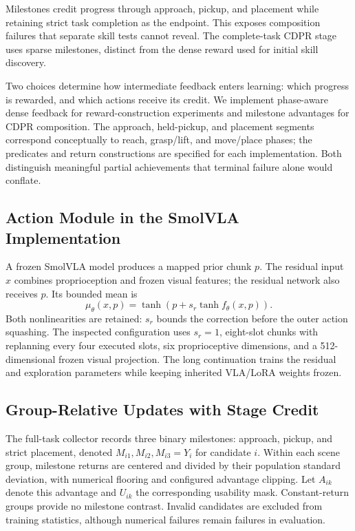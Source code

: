 Milestones credit progress through approach, pickup, and placement while retaining strict task completion as the endpoint. This exposes composition failures that separate skill tests cannot reveal. The complete-task CDPR stage uses sparse milestones, distinct from the dense reward used for initial skill discovery.

Two choices determine how intermediate feedback enters learning: which progress is rewarded, and which actions receive its credit. We implement phase-aware dense feedback for reward-construction experiments and milestone advantages for CDPR composition. The approach, held-pickup, and placement segments correspond conceptually to reach, grasp/lift, and move/place phases; the predicates and return constructions are specified for each implementation. Both distinguish meaningful partial achievements that terminal failure alone would conflate.



\subsection{Action Module in the SmolVLA Implementation}
A frozen SmolVLA model produces a mapped prior chunk $p$. The residual input $x$ combines proprioception and frozen visual features; the residual network also receives $p$. Its bounded mean is
\begin{equation}
\mu_\theta(x,p)=\tanh\!\left(p+s_r\tanh f_\theta(x,p)\right).
\label{eq:actor}
\end{equation}
Both nonlinearities are retained: $s_r$ bounds the correction before the outer action squashing. The inspected configuration uses $s_r=1$, eight-slot chunks with replanning every four executed slots, six proprioceptive dimensions, and a 512-dimensional frozen visual projection. The long continuation trains the residual and exploration parameters while keeping inherited VLA/LoRA weights frozen. 

\subsection{Group-Relative Updates with Stage Credit}
The full-task collector records three binary milestones: approach, pickup, and strict placement, denoted $M_{i1},M_{i2},M_{i3}=Y_i$ for candidate $i$. Within each scene group, milestone returns are centered and divided by their population standard deviation, with numerical flooring and configured advantage clipping. Let $A_{ik}$ denote this advantage and $U_{ik}$ the corresponding usability mask. Constant-return groups provide no milestone contrast. Invalid candidates are excluded from training statistics, although numerical failures remain failures in evaluation.

